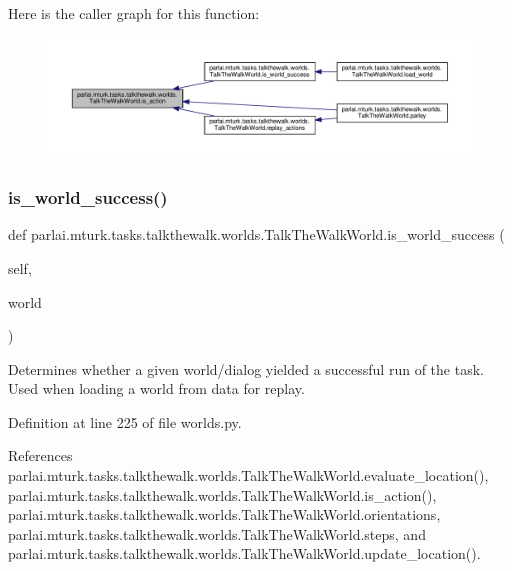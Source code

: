 Here is the caller graph for this function\+:
\nopagebreak
\begin{figure}[H]
\begin{center}
\leavevmode
\includegraphics[width=350pt]{classparlai_1_1mturk_1_1tasks_1_1talkthewalk_1_1worlds_1_1TalkTheWalkWorld_a39aaaabf0760ced0c5d73f80ce196521_icgraph}
\end{center}
\end{figure}
\mbox{\label{classparlai_1_1mturk_1_1tasks_1_1talkthewalk_1_1worlds_1_1TalkTheWalkWorld_ae43f66ea3849c1b8015132e53d1a617b}} 
\subsubsection{\texorpdfstring{is\+\_\+world\+\_\+success()}{is\_world\_success()}}
{\footnotesize\ttfamily def parlai.\+mturk.\+tasks.\+talkthewalk.\+worlds.\+Talk\+The\+Walk\+World.\+is\+\_\+world\+\_\+success (\begin{DoxyParamCaption}\item[{}]{self,  }\item[{}]{world }\end{DoxyParamCaption})}

\begin{DoxyVerb}Determines whether a given world/dialog yielded a successful
   run of the task. Used when loading a world from data for replay.
\end{DoxyVerb}
 

Definition at line 225 of file worlds.\+py.



References parlai.\+mturk.\+tasks.\+talkthewalk.\+worlds.\+Talk\+The\+Walk\+World.\+evaluate\+\_\+location(), parlai.\+mturk.\+tasks.\+talkthewalk.\+worlds.\+Talk\+The\+Walk\+World.\+is\+\_\+action(), parlai.\+mturk.\+tasks.\+talkthewalk.\+worlds.\+Talk\+The\+Walk\+World.\+orientations, parlai.\+mturk.\+tasks.\+talkthewalk.\+worlds.\+Talk\+The\+Walk\+World.\+steps, and parlai.\+mturk.\+tasks.\+talkthewalk.\+worlds.\+Talk\+The\+Walk\+World.\+update\+\_\+location().



